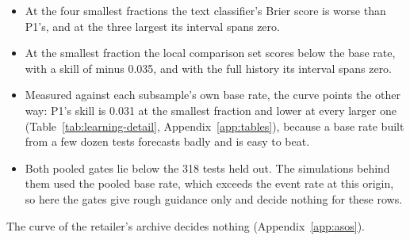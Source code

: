 \begin{itemize}
\item At the four smallest fractions the text classifier's Brier score is worse than P1's, and at the three largest its interval spans zero.
\item At the smallest fraction the local comparison set scores below the base rate, with a skill of minus 0.035, and with the full history its interval spans zero.
\item Measured against each subsample's own base rate, the curve points the other way: P1's skill is 0.031 at the smallest fraction and lower at every larger one (Table~\ref{tab:learning-detail}, Appendix~\ref{app:tables}), because a base rate built from a few dozen tests forecasts badly and is easy to beat.
\item Both pooled gates lie below the 318 tests held out. The simulations behind them used the pooled base rate, which exceeds the event rate at this origin, so here the gates give rough guidance only and decide nothing for these rows.
\end{itemize}
The curve of the retailer's archive decides nothing (Appendix~\ref{app:asos}).
